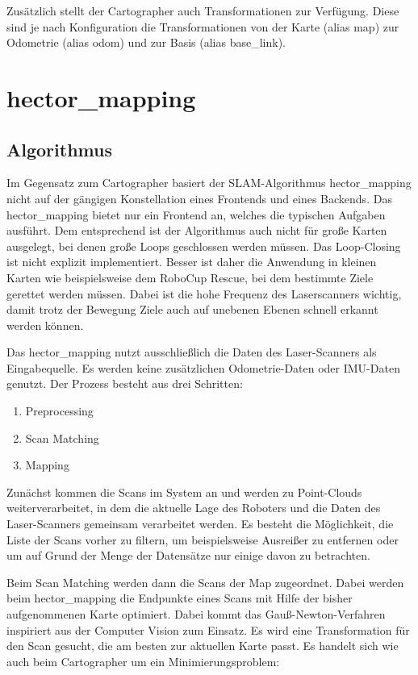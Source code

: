 Zusätzlich stellt der Cartographer auch Transformationen zur Verfügung. Diese sind je nach Konfiguration die Transformationen von der Karte (alias map) zur Odometrie (alias odom) und zur Basis (alias base\_link). \autocite{cartographerRosWiki}

\section{hector\_mapping}

\subsection{Algorithmus}

Im Gegensatz zum Cartographer basiert der SLAM-Algorithmus hector\_mapping nicht auf der gängigen Konstellation eines Frontends und eines Backends. Das hector\_mapping bietet nur ein Frontend an, welches die typischen Aufgaben ausführt. Dem entsprechend ist der Algorithmus auch nicht für große Karten ausgelegt, bei denen große Loops geschlossen werden müssen. Das Loop-Closing ist nicht explizit implementiert. Besser ist daher die Anwendung in kleinen Karten wie beispielsweise dem RoboCup Rescue, bei dem bestimmte Ziele gerettet werden müssen. Dabei ist die hohe Frequenz des Laserscanners wichtig, damit trotz der Bewegung Ziele auch auf unebenen Ebenen schnell erkannt werden können.

Das hector\_mapping nutzt ausschließlich die Daten des Laser-Scanners als Eingabequelle. Es werden keine zusätzlichen Odometrie-Daten oder IMU-Daten genutzt. Der Prozess besteht aus drei Schritten:
\begin{enumerate}
  \item Preprocessing
  \item Scan Matching
  \item Mapping
\end{enumerate}
Zunächst kommen die Scans im System an und werden zu Point-Clouds weiterverarbeitet, in dem die aktuelle Lage des Roboters und die Daten des Laser-Scanners gemeinsam verarbeitet werden. Es besteht die Möglichkeit, die Liste der Scans vorher zu filtern, um beispielsweise Ausreißer zu entfernen oder um auf Grund der Menge der Datensätze nur einige davon zu betrachten.

Beim Scan Matching werden dann die Scans der Map zugeordnet. Dabei werden beim hector\_mapping die Endpunkte eines Scans mit Hilfe der bisher aufgenommenen Karte optimiert. Dabei kommt das Gauß-Newton-Verfahren inspiriert aus der Computer Vision zum Einsatz. Es wird eine Transformation für den Scan gesucht, die am besten zur aktuellen Karte passt. Es handelt sich wie auch beim Cartographer um ein Minimierungsproblem:

